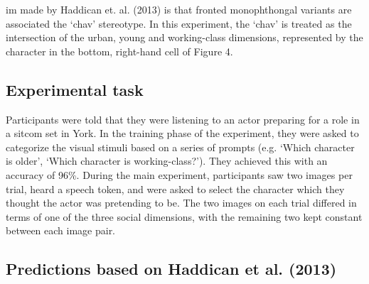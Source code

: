 \documentclass[PWPL]{article}
\begin{document}
im made by Haddican et. al. (2013) is that fronted monophthongal  variants are associated the `chav' stereotype. In this experiment, the `chav' is treated as the intersection of the urban, young and working-class dimensions, represented by the character in the bottom, right-hand cell of Figure 4.

\subsection{Experimental task}

Participants were told that they were listening to an actor preparing for a role in a sitcom set in York. In the training phase of the experiment, they were asked to categorize the visual stimuli based on a series of prompts (e.g. `Which character is older', `Which character is working-class?'). They achieved this with an accuracy of 96\%. During the main experiment, participants saw two images per trial, heard a speech token, and were asked to select the character which they thought the actor was pretending to be. The two images on each trial differed in terms of one of the three social dimensions, with the remaining two kept constant between each image pair.


\subsection{Predictions based on Haddican et al. (2013)}
\end{document}
